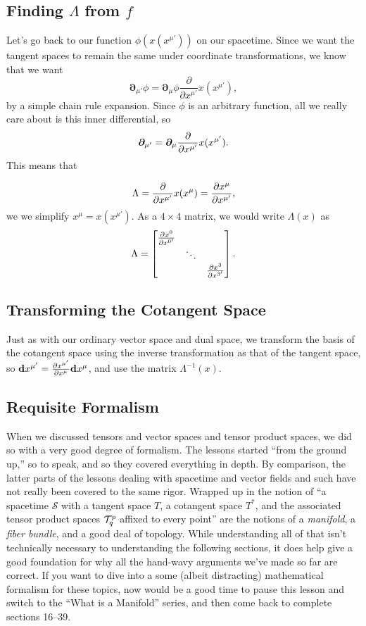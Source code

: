 \subsection{Finding $\Lambda$ from $f$}
Let's go back to our function $\phi(x(x^{\mu'}))$ on our spacetime.
Since we want the tangent spaces to remain the same under coordinate transformations, we know that we want
\[ \bm{\partial}_{\mu'} \phi = \bm{\partial}_\mu \phi \frac{\partial}{\partial{x^{\mu'}}}x(x^{\mu'}), \]
by a simple chain rule expansion.
Since $\phi$ is an arbitrary function, all we really care about is this inner differential, so
\[ \bm{\partial}_{\mu'} = \bm{\partial}_\mu \pdv{}{x^{\mu'}}x(x^{\mu'}). \]
This means that 

\[ \Lambda = \pdv{}{x^{\mu'}} x\qty(x^\mu) = \pdv{x^\mu}{x^{\mu'}}, \]
we we simplify $x^\mu = x(x^{\mu'})$.
As a  $4\times 4$ matrix, we would write $\Lambda(x)$ as 
\[ \Lambda = 
    \begin{bmatrix}
        \pdv{x^0}{x^{0'}} & & \\
        & \ddots & \\
        & & \pdv{x^3}{x^{3'}}
    \end{bmatrix}.
\]
\subsection{Transforming the Cotangent Space}
Just as with our ordinary vector space and dual space, we transform the basis of the cotangent space using the inverse transformation as that of the tangent space, so $\vb{d}x^{\mu'} = \pdv{x^{\mu'}}{x^\mu} \vb{d}x^\mu$, and use the matrix $\Lambda^{-1}(x)$.

\subsection{Requisite Formalism}
When we discussed tensors and vector spaces and tensor product spaces, we did so with a very good degree of formalism.
The lessons started ``from the ground up,'' so to speak, and so they covered everything in depth.
By comparison, the latter parts of the lessons dealing with spacetime and vector fields and such have not really been covered to the same rigor.
Wrapped up in the notion of ``a spacetime $\mathcal{S}$ with a tangent space $T$, a cotangent space $T^*$, and the associated tensor product spaces $\mathcal{T}^p_q$ affixed to every point'' are the notions of a \emph{manifold}, a \emph{fiber bundle}, and a good deal of topology.
While understanding all of that isn't technically necessary to understanding the following sections, it does help give a good foundation for why all the hand-wavy arguments we've made so far are correct.
If you want to dive into a some (albeit distracting) mathematical formalism for these topics, now would be a good time to pause this lesson and switch to the ``What is a Manifold'' series, and then come back to complete sections 16--39.
